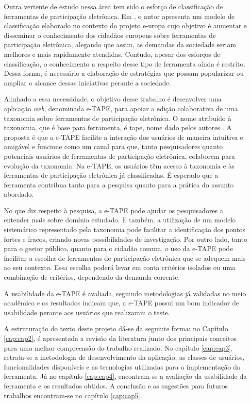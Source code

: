 \par
Outra vertente de estudo nessa área tem sido o esforço de classificação de ferramentas de participação eletrônica. Em  , o autor apresenta um modelo 
de classificação elaborado no contexto do projeto \acrfull{e-uropa} cujo objetivo é aumentar e disseminar o conhecimento dos cidadãos europeus sobre ferramentas de participação 
eletrônica, alegando que assim, as demandas da sociedade seriam melhores e mais rapidamente atendidas. Contudo, apesar dos esforços de classificação, o conhecimento a respeito desse 
tipo de ferramenta ainda é restrito. Dessa forma, é necessário a elaboração de estratégias que possam popularizar ou ampliar o alcance dessas iniciativas perante a sociedade.

\par
Alinhado a essa necessidade, o objetivo desse trabalho é desenvolver uma aplicação \textit{web}, denominada e-TAPE, para apoiar a edição colaborativa de uma taxonomia sobre 
ferramentas de participação eletrônica. O nome atribuído à taxonomia, que é base para ferramenta, é \acrfull{tape}, nome dado pelos autores . 
A proposta é que a e-TAPE facilite a interação dos usuários de maneira intuitiva e amigável e funcione como um canal para que, tanto pesquisadores quanto potenciais usuários de
ferramentas de participação eletrônica, colaborem para evolução da taxonomia. Na e-TAPE, os usuários têm acesso à taxonomia e às ferramentas de participação eletrônica já classificadas.
É esperado que a ferramenta contribua tanto para a pesquisa quanto para a prática do assunto abordado. 

\par
No que diz respeito à pesquisa, a e-TAPE pode ajudar os pesquisadores a entender mais sobre domínio estudado. E também, a utilização de um modelo sistemático representado pela taxonomia 
pode facilitar a identificação dos pontos fortes e fracos, criando novas possibilidades de investigação. Por outro lado, tanto para o gestor público, quanto para o cidadão comum, 
o uso da e-TAPE pode facilitar a escolha de ferramentas de participação eletrônica que se adequem mais ao seu contexto. Essa escolha poderá levar em conta critérios 
isolados ou uma combinação de critérios, dependendo da demanda corrente. 

\par
A usabilidade da e-TAPE é avaliada, seguindo metodologias já validadas no meio acadêmico e os resultados indicam que, a e-TAPE possui um bom indicador de usabilidade perante aos 
usuários que realizaram o teste. 

\par
A estruturação do texto deste projeto dá-se da seguinte forma: no Capítulo \ref{cap:cap2}, é apresentada a revisão da literatura junto dos principais conceitos para uma melhor 
compreensão do trabalho realizado. No capítulo \ref{cap:cap3}, retrata-se a metodologia de desenvolvimento da aplicação, as classes de usuários, funcionalidades disponíveis e
as tecnologias utilizadas para a implementação da ferramenta. Já no capítulo \ref{cap:cap4}, encontram-se a avaliação da usabilidade da ferramenta e os resultados obtidos. 
A conclusão e as sugestões para futuros trabalhos encontram-se no capítulo \ref{cap:cap5}.
